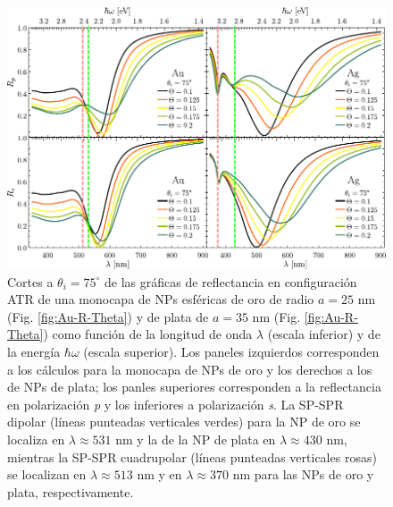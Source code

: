 	\begin{figure}[h!]\centering
	\includegraphics[scale=1]{2-Resultados/figs/6-AuThetaVar/0-cut75_Au_Aug.pdf}\vspace*{-.5em}
	\caption{Cortes a $\theta_i = 75^\circ$ de las gráficas de reflectancia  en configuración ATR  de una monocapa de NPs esféricas de oro de radio $a=25$ nm (Fig. \ref{fig:Au-R-Theta}) y de plata de $a=35$ nm (Fig. \ref{fig:Au-R-Theta}) como función de la longitud de onda $\lambda$ (escala inferior) y de la energía $\hbar\omega$ (escala superior). Los paneles izquierdos corresponden a los cálculos para la monocapa de NPs de oro y los derechos a los de NPs de plata; los panles superiores corresponden a la reflectancia en polarización \emph{p} y los inferiores a polarización \emph{s}. La SP-SPR dipolar (líneas punteadas verticales verdes) para la NP de oro se localiza en  $\lambda \approx 531$ nm y la de la NP de plata en $\lambda\approx430$ nm, mientras la SP-SPR cuadrupolar (líneas punteadas verticales rosas) se localizan en $\lambda\approx513$ nm y en $\lambda\approx370$ nm para las NPs de oro y plata, respectivamente.}\label{fig:AuAg-Cuts-75}
	\end{figure}	

